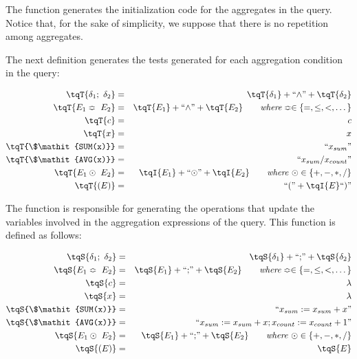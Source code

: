 The function \tqI{\_} generates the initialization code for the aggregates in the query. 
Notice that, for the sake of simplicity, we suppose that there is no repetition among aggregates.

The next definition generates the tests generated for each aggregation condition in the query:

\begin{eqnarray*}
\tqT{\delta_1 ; \ \delta_2} 	& = & \tqT{\delta_1} + \hbox{``$\wedge$''} + \tqT{\delta_2} \\
\tqT{E_1 \Bumpeq \ E_2} 		& = & \tqT{E_1} + \hbox{``$\wedge$''} + \tqT{E_2}
									\qquad \mathit{where} \Bumpeq \in \{ =, \leq, <, \dots \}\\
\tqT{c} 						& = & c \\
\tqT{x} 						& = & x \\
\tqT{\$\mathit{SUM(x)}} 		& = & \hbox{``$x_{sum}$''} \\
\tqT{\$\mathit{AVG(x)}} 		& = & \hbox{``$x_{sum} / x_{count}$''} \\
\tqT{E_1 \odot \ E_2}		& = & \tqI{E_1} + \hbox{``$\odot$''} + \tqI{E_2} 
									\qquad \mathit{where}\ \odot \in \{ +, -, *, / \}\\
\tqT{( E )} 					& = & \hbox{``(''} + \tqI{E} \hbox{``)''}
\end{eqnarray*}

The function \tqS{\_} is responsible for generating the operations that update the variables involved in the aggregation expressions of the query.
This function is defined as follows:

\begin{eqnarray*}
\tqS{\delta_1 ; \ \delta_2} 	& = & \tqS{\delta_1} + \hbox{``;''} + \tqS{\delta_2} \\
\tqS{E_1 \Bumpeq \ E_2} 		& = & \tqS{E_1} + \hbox{``;''} + \tqS{E_2}
									\qquad \mathit{where} \Bumpeq \in \{ =, \leq, <, \dots \}\\
\tqS{c} 						& = & \lambda \\
\tqS{x} 						& = & \lambda \\
\tqS{\$\mathit{SUM(x)}} 		& = & \hbox{``$x_{sum} := x_{sum} + x$''} \\
\tqS{\$\mathit{AVG(x)}} 		& = & \hbox{``$x_{sum}:= x_{sum} + x ; x_{count} := x_{count} + 1$''} \\
\tqS{E_1 \odot \ E_2}		& = & \tqS{E_1} + \hbox{``;''} + \tqS{E_2} 
									\qquad \mathit{where}\ \odot \in \{ +, -, *, / \}\\
\tqS{( E )} 					& = & \tqS{E}
\end{eqnarray*}

